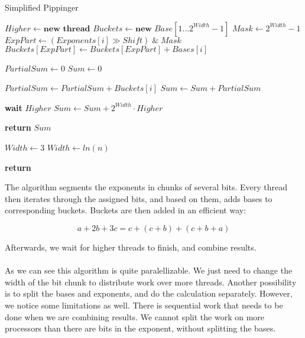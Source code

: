 \begin{algorithm}
\caption{Simplified Pippinger}\label{multiexp}
\begin{algorithmic}[1]

        \State $Higher \gets \textbf{new thread}$ 
    \EndIf
    \State $Buckets \gets \textbf{new} \; Base[1\dots2^{Width}-1]$
    \State $Mask \gets 2^{Width}-1$
        \State $ExpPart \gets (Exponents[i] \gg Shift) \; \&  \;Mask$
            \State $Buckets[ExpPart] \gets Buckets[ExpPart] + Bases[i]$
        \EndIf
    \EndFor
    
    \State $PartialSum \gets 0$
    \State $Sum \gets 0$
    
        \State $PartialSum \gets PartialSum + Buckets[i]$
        \State $Sum \gets Sum + PartialSum$
    \EndFor
    
        \State \textbf{wait} $Higher$
        \State $Sum \gets Sum + 2^{Width} \cdot Higher$ 
    \EndIf
    
    \State \textbf{return} $Sum$
\EndFunction

        \State $Width \gets 3$
    \Else
        \State $Width \gets ln(n)$
    \EndIf

    \State \textbf{return} 
    
\EndFunction
\end{algorithmic}
\end{algorithm}

The algorithm segments the exponents in chunks of several bits. Every thread then iterates through the assigned bits, and based on them, adds bases to corresponding buckets. Buckets are then added in an efficient way:

$$ a + 2b + 3c = c + (c + b) + (c + b + a) $$

Afterwards, we wait for higher threads to finish, and combine results.\\
\\
As we can see this algorithm is quite paralellizable. We just need to change the width of the bit chunk to distribute work over more threads. Another possibility is to split the bases and exponents, and do the calculation separately. However, we notice some limitations as well. There is sequential work that needs to be done when we are combining results. We cannot split the work on more processors than there are bits in the exponent, without splitting the bases.
\\
